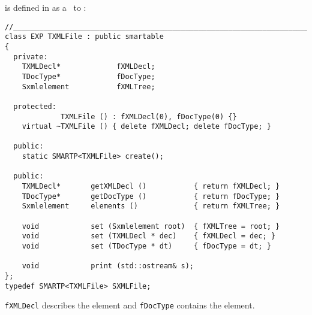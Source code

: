  is defined in  as a \smart\ to :
\begin{lstlisting}[language=CPlusPlus]
//______________________________________________________________________________
class EXP TXMLFile : public smartable
{
  private:
    TXMLDecl*             fXMLDecl;
    TDocType*             fDocType;
    Sxmlelement           fXMLTree;

  protected:
			 TXMLFile () : fXMLDecl(0), fDocType(0) {}
    virtual ~TXMLFile () { delete fXMLDecl; delete fDocType; }

  public:
    static SMARTP<TXMLFile> create();

  public:
    TXMLDecl* 		getXMLDecl ()			{ return fXMLDecl; }
    TDocType* 		getDocType ()			{ return fDocType; }
    Sxmlelement		elements () 			{ return fXMLTree; }

    void 			set (Sxmlelement root)	{ fXMLTree = root; }
    void 			set (TXMLDecl * dec)	{ fXMLDecl = dec; }
    void 			set (TDocType * dt)		{ fDocType = dt; }

    void 			print (std::ostream& s);
};
typedef SMARTP<TXMLFile> SXMLFile;
\end{lstlisting}

{\tt fXMLDecl} describes the  element and {\tt fDocType} contains the  element.


